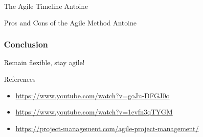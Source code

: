 \documentclass[10pt]{beamer}
\begin{document}
\begin{frame}{The Agile Timeline}
    Antoine
\end{frame}

\begin{frame}{Pros and Cons of the Agile Method}
    Antoine
\end{frame}

\begin{frame}[plain]
  \frametitle{Conclusion}
  \begin{center}
      \Huge Remain flexible, stay agile!
  \end{center}
\end{frame}

\begin{frame}{References}
  \begin{itemize}
    \item \href{https://www.youtube.com/watch?v=goJu-DFGJ0o}{https://www.youtube.com/watch?v=goJu-DFGJ0o}
    \item \href{https://www.youtube.com/watch?v=1evfn3qTYGM}{https://www.youtube.com/watch?v=1evfn3qTYGM}
    \item \href{https://project-management.com/agile-project-management/}{https://project-management.com/agile-project-management/}
  \end{itemize}
\end{frame}
\end{document}
